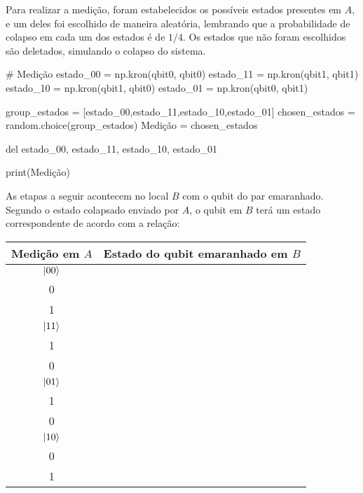 Para realizar a medição, foram estabelecidos os possíveis estados presentes em \(A\), e um deles foi escolhido de maneira aleatória, lembrando que a probabilidade de colapso em cada um dos estados é de \(1/4\). Os estados que não foram escolhidos são deletados, simulando o colapso do sistema.
\begin{pycode}
  # Medição
  estado_00 = np.kron(qbit0, qbit0)
  estado_11 = np.kron(qbit1, qbit1)
  estado_10 = np.kron(qbit1, qbit0)
  estado_01 = np.kron(qbit0, qbit1)

  group_estados = [estado_00,estado_11,estado_10,estado_01]
  chosen_estados = random.choice(group_estados)
  Medição = chosen_estados

  del estado_00, estado_11, estado_10, estado_01

  print(Medição)
\end{pycode}
As etapas a seguir acontecem no local \(B\) com o qubit do par emaranhado. Segundo o estado colapsado enviado por \(A\), o qubit em \(B\) terá um estado correspondente de acordo com a relação:
\begin{center}
  \begin{tabular}{cc}
    \toprule
    Medição em \(A\) & Estado do qubit emaranhado em \(B\) \\
    \midrule
    \(\ket{00}\) & \(\alpha \begin{bmatrix} 1 \\ 0 \end{bmatrix} + \beta \begin{bmatrix} 0 \\ 1 \end{bmatrix}\) \\
    \(\ket{11}\) & \(\alpha \begin{bmatrix} 0 \\ 1 \end{bmatrix} - \beta \begin{bmatrix} 1 \\ 0 \end{bmatrix}\) \\
    \(\ket{01}\) & \(\alpha \begin{bmatrix} 0 \\ 1 \end{bmatrix} + \beta \begin{bmatrix} 1 \\ 0 \end{bmatrix}\) \\
    \(\ket{10}\) & \(\alpha \begin{bmatrix} 1 \\ 0 \end{bmatrix} - \beta \begin{bmatrix} 0 \\ 1 \end{bmatrix}\) \\
    \bottomrule
  \end{tabular}
\end{center}
